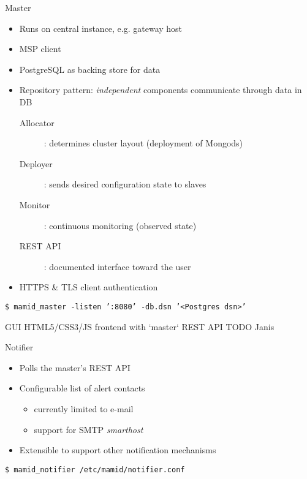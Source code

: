 \documentclass[11pt,aspectratio=169]{beamer}
\begin{document}
    
    \begin{frame}{Master}
        
        \begin{itemize}
            \item Runs on central instance, e.g. gateway host
            \item MSP client
            \item PostgreSQL as backing store for data
            \item Repository pattern: \textit{independent} components communicate through data in DB
            \begin{description}
                 \item[Allocator]: determines cluster layout (deployment of Mongods)
                 \item[Deployer]: sends desired configuration state to slaves
                 \item[Monitor]: continuous monitoring (observed state)
                 \item[REST API]: documented interface toward the user
            \end{description}
            \item HTTPS \& TLS client authentication
        \end{itemize}
        \vspace{15pt}
        \texttt{\$ mamid\_master -listen ':8080' -db.dsn '<Postgres dsn>'}
        
    \end{frame}   
    
    
    \begin{frame}{GUI}
           HTML5/CSS3/JS frontend with `master` REST API
           TODO Janis %
    \end{frame}
    
    \begin{frame}{Notifier}
        
        \begin{itemize}
            \item Polls the master's REST API
            \item Configurable list of alert contacts
            \begin{itemize}
                \item currently limited to e-mail
                \item support for SMTP \textit{smarthost}
            \end{itemize}
            \item Extensible to support other notification mechanisms %
        \end{itemize}
        \vspace{15pt}
        \texttt{\$ mamid\_notifier /etc/mamid/notifier.conf}
    \end{frame}
    
    
    
    
    
\end{document}
